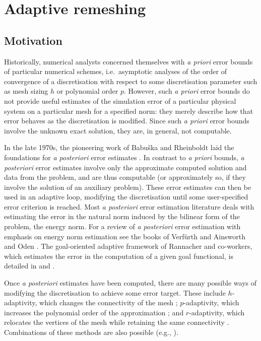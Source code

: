 
\chapter{Adaptive remeshing}\label{chap:Adaptivity}

\section{Motivation}
Historically, numerical analysts concerned themselves
with \emph{a priori} error bounds of particular numerical
schemes, i.e.\@ \ asymptotic analyses of the order of convergence
of a discretisation with respect to some discretisation parameter
such as mesh sizing $h$ or polynomial order $p$. However, such
\emph{a priori} error bounds do not provide useful estimates
of the simulation error of a particular physical system on
a particular mesh for a specified norm: they merely describe
how that error behaves as the discretisation is modified. Since
such \emph{a priori} error bounds involve the unknown exact solution,
they are, in general, not computable.

In the late 1970s, the pioneering work of Babu\v ska
and Rheinboldt laid the foundations for \emph{a posteriori}
error estimates \citep{babuska1978,babuska1978b}.
In contrast to \emph{a priori} bounds,
\emph{a posteriori} error estimates involve only
the approximate computed solution and data from the problem,
and are thus computable (or approximately so, if they involve the
solution of an auxiliary problem). These error
estimates can then be used in an adaptive loop, modifying
the discretisation until some user-specified error criterion
is reached. Most \emph{a posteriori} error estimation literature deals with estimating
the error in the natural norm induced by the bilinear form
of the problem, the energy norm.
For a review of \emph{a posteriori} error estimation
with emphasis on energy norm estimation
see the books of Verf\"urth \citep{verfurth1996} and
Ainsworth and Oden \citep{ainsworth2000}. The goal-oriented
adaptive framework of Rannacher and co-workers, which estimates
the error in the computation of a given goal functional, is detailed
in \citet{becker2001} and \citet{bangerth2003}.

Once \emph{a posteriori} estimates have been computed,
there are many possible ways of modifying the discretisation
to achieve some error target. These include $h$-adaptivity,
which changes the connectivity of the mesh \citep{berger1989}; $p$-adaptivity,
which increases the polynomial order of the approximation
\citep{babuska1994}; and $r$-adaptivity, which relocates
the vertices of the mesh while retaining the same connectivity
\citep{budd2009}. Combinations of these methods are also
possible (e.g., \citet{houston2001,ledger2003}).

